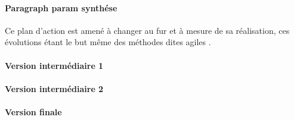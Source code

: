 	\paragraph{Paragraph param synthése}




	Ce plan d'action est amené à changer au fur et à mesure de sa réalisation, ces évolutions étant le but même des méthodes dites \og agiles \fg.
	
	\paragraph{Version intermédiaire 1}


	\paragraph{Version intermédiaire 2}

	\paragraph{Version finale}
